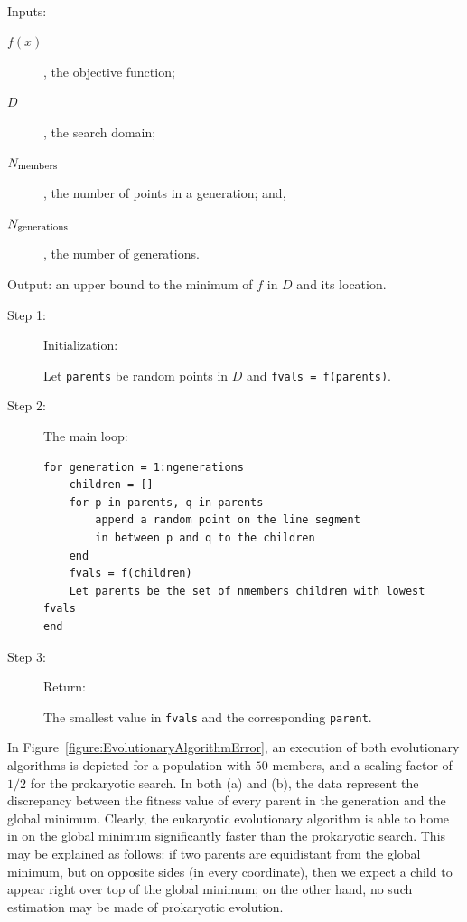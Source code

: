 \begin{algorithm}~\\
Inputs: \begin{description} \item[$f(x)$], the objective function;
\item[$D$], the search domain;
\item[$N_{\rm members}$], the number of points in a generation; and,
\item[$N_{\rm generations}$], the number of generations.
\end{description}
Output: an upper bound to the minimum of $f$ in $D$ and its location.
\begin{description}
\item[Step 1:] Initialization:

Let {\tt parents} be random points in $D$ and {\tt fvals = f(parents)}.
\item[Step 2:] The main loop:
\begin{verbatim}
for generation = 1:ngenerations
    children = []
    for p in parents, q in parents
        append a random point on the line segment
        in between p and q to the children
    end
    fvals = f(children)
    Let parents be the set of nmembers children with lowest fvals
end    
\end{verbatim}
\item[Step 3:] Return:

The smallest value in {\tt fvals} and the corresponding {\tt parent}.
\end{description}
\end{algorithm}

In Figure~\ref{figure:EvolutionaryAlgorithmError}, an execution of both evolutionary algorithms is depicted for a population with $50$ members, and a scaling factor of $1/2$ for the prokaryotic search. In both (a) and (b), the data represent the discrepancy between the fitness value of every parent in the generation and the global minimum. Clearly, the eukaryotic evolutionary algorithm is able to home in on the global minimum significantly faster than the prokaryotic search. This may be explained as follows: if two parents are equidistant from the global minimum, but on opposite sides (in every coordinate), then we expect a child to appear right over top of the global minimum; on the other hand, no such estimation may be made of prokaryotic evolution.

